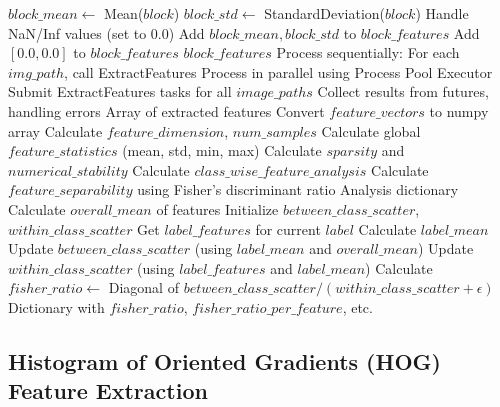 \begin{algorithm}[!htbp]
\begin{algorithmic}[1]
                \State $block\_mean \leftarrow$ Mean($block$)
                \State $block\_std \leftarrow$ StandardDeviation($block$)
                \State Handle NaN/Inf values (set to 0.0)
                \State Add $block\_mean, block\_std$ to $block\_features$
            \Else
                \State Add $[0.0, 0.0]$ to $block\_features$
            \EndIf
        \EndFor
    \EndFor
    \Return $block\_features$
\EndProcedure
\Statex
{}
        \State Process sequentially: For each $img\_path$, call ExtractFeatures
    \Else
        \State Process in parallel using Process Pool Executor
        \State Submit ExtractFeatures tasks for all $image\_paths$
        \State Collect results from futures, handling errors
    \EndIf
    \Return Array of extracted features
\EndProcedure
\Statex
{}
    \State Convert $feature\_vectors$ to numpy array
    \State Calculate $feature\_dimension$, $num\_samples$
    \State Calculate global $feature\_statistics$ (mean, std, min, max)
    \State Calculate $sparsity$ and $numerical\_stability$
        \State Calculate $class\_wise\_feature\_analysis$
        \State Calculate $feature\_separability$ using Fisher's discriminant ratio
    \EndIf
    \Return Analysis dictionary
\EndProcedure
\Statex
{}
      \EndIf
    \State Calculate $overall\_mean$ of features
    \State Initialize $between\_class\_scatter$, $within\_class\_scatter$
        \State Get $label\_features$ for current $label$
        \State Calculate $label\_mean$
        \State Update $between\_class\_scatter$ (using $label\_mean$ and $overall\_mean$)
        \State Update $within\_class\_scatter$ (using $label\_features$ and $label\_mean$)
    \EndFor
    \State Calculate $fisher\_ratio \leftarrow$ Diagonal of $between\_class\_scatter / (within\_class\_scatter + \epsilon)$
    \Return Dictionary with $fisher\_ratio$, $fisher\_ratio\_per\_feature$, etc.
\EndProcedure
\end{algorithmic}
\end{algorithm}

\subsection{Histogram of Oriented Gradients (HOG) Feature Extraction}
\label{subsec:hog-extraction}

